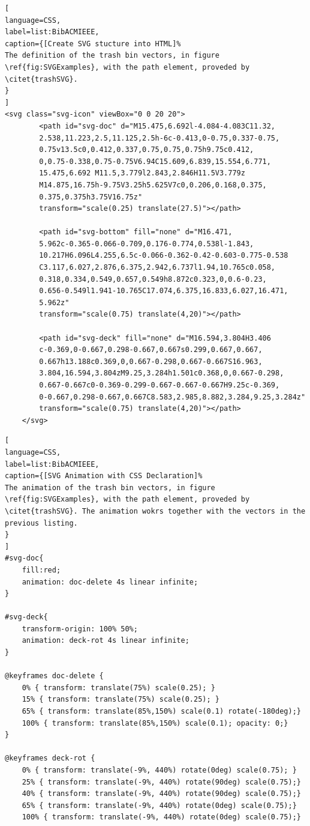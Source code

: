 \begin{lstlisting}[
language=CSS,
label=list:BibACMIEEE,
caption={[Create SVG stucture into HTML]%
The definition of the trash bin vectors, in figure \ref{fig:SVGExamples}, with the path element, proveded by \citet{trashSVG}.
}
]
<svg class="svg-icon" viewBox="0 0 20 20">
		<path id="svg-doc" d="M15.475,6.692l-4.084-4.083C11.32,
		2.538,11.223,2.5,11.125,2.5h-6c-0.413,0-0.75,0.337-0.75,
		0.75v13.5c0,0.412,0.337,0.75,0.75,0.75h9.75c0.412,
		0,0.75-0.338,0.75-0.75V6.94C15.609,6.839,15.554,6.771,
		15.475,6.692 M11.5,3.779l2.843,2.846H11.5V3.779z
		M14.875,16.75h-9.75V3.25h5.625V7c0,0.206,0.168,0.375,
		0.375,0.375h3.75V16.75z"
		transform="scale(0.25) translate(27.5)"></path>

		<path id="svg-bottom" fill="none" d="M16.471,
		5.962c-0.365-0.066-0.709,0.176-0.774,0.538l-1.843,
		10.217H6.096L4.255,6.5c-0.066-0.362-0.42-0.603-0.775-0.538
		C3.117,6.027,2.876,6.375,2.942,6.737l1.94,10.765c0.058,
		0.318,0.334,0.549,0.657,0.549h8.872c0.323,0,0.6-0.23,
		0.656-0.549l1.941-10.765C17.074,6.375,16.833,6.027,16.471,
		5.962z"
		transform="scale(0.75) translate(4,20)"></path>

		<path id="svg-deck" fill="none" d="M16.594,3.804H3.406
		c-0.369,0-0.667,0.298-0.667,0.667s0.299,0.667,0.667,
		0.667h13.188c0.369,0,0.667-0.298,0.667-0.667S16.963,
		3.804,16.594,3.804zM9.25,3.284h1.501c0.368,0,0.667-0.298,
		0.667-0.667c0-0.369-0.299-0.667-0.667-0.667H9.25c-0.369,
		0-0.667,0.298-0.667,0.667C8.583,2.985,8.882,3.284,9.25,3.284z"
		transform="scale(0.75) translate(4,20)"></path>
	</svg>

\end{lstlisting}
\label{list:SVGStuctureHTML}

\begin{lstlisting}[
language=CSS,
label=list:BibACMIEEE,
caption={[SVG Animation with CSS Declaration]%
The animation of the trash bin vectors, in figure \ref{fig:SVGExamples}, with the path element, proveded by \citet{trashSVG}. The animation wokrs together with the vectors in the previous listing.
}
]
#svg-doc{
	fill:red;
	animation: doc-delete 4s linear infinite;
}

#svg-deck{
	transform-origin: 100% 50%;
	animation: deck-rot 4s linear infinite;
}

@keyframes doc-delete {
	0% { transform: translate(75%) scale(0.25); }
	15% { transform: translate(75%) scale(0.25); }
	65% { transform: translate(85%,150%) scale(0.1) rotate(-180deg);}
	100% { transform: translate(85%,150%) scale(0.1); opacity: 0;}
}

@keyframes deck-rot {
	0% { transform: translate(-9%, 440%) rotate(0deg) scale(0.75); }
	25% { transform: translate(-9%, 440%) rotate(90deg) scale(0.75);}
	40% { transform: translate(-9%, 440%) rotate(90deg) scale(0.75);}
	65% { transform: translate(-9%, 440%) rotate(0deg) scale(0.75);}
	100% { transform: translate(-9%, 440%) rotate(0deg) scale(0.75);}

\end{lstlisting}
\label{list:Keys_CSS}